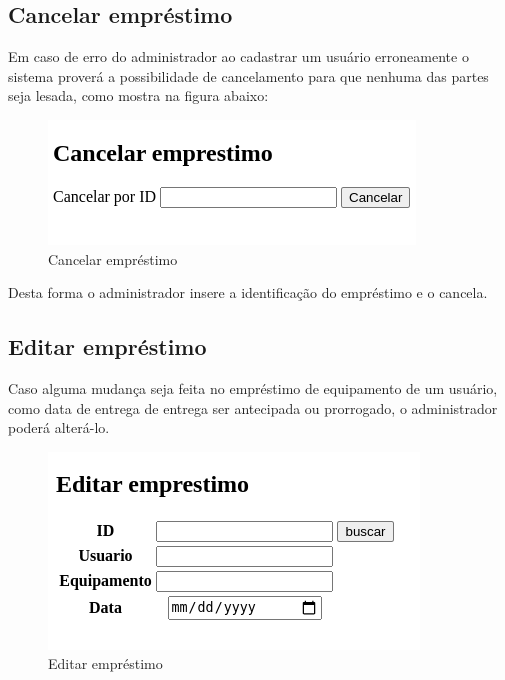 \documentclass[
12pt,				%
oneside,			%
a4paper,			%
section=TITLE,
brazil,				%
]{abntex2}
\begin{document}
  \subsection{Cancelar empréstimo}

  Em caso de erro do administrador ao cadastrar um usuário erroneamente o sistema
  proverá a possibilidade  de cancelamento para que nenhuma das partes seja
  lesada, como mostra na figura abaixo:

  \begin{figure}[htb]
    \caption{\label{}Cancelar empréstimo}
    \begin{center}
      \includegraphics[scale=1.00]{./img/cancelar-imprestimo.png}
    \end{center}
  \end{figure}

  Desta forma o administrador insere a identificação do empréstimo e o cancela.

  \subsection{Editar empréstimo}

  Caso alguma mudança seja feita no empréstimo de equipamento de um usuário, como
  data de entrega de entrega ser antecipada ou prorrogado, o administrador poderá
  alterá-lo.

  \begin{figure}[htb]
    \caption{\label{fig_circulo}Editar empréstimo}
    \begin{center}
      \includegraphics[scale=1]{./img/editar.png}
    \end{center}
  \end{figure}
\end{document}

